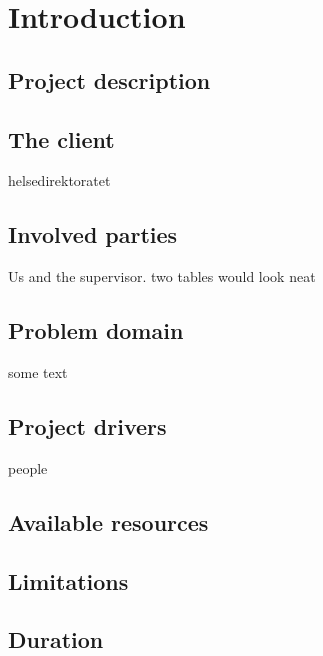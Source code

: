 
\chapter{Introduction} %

\label{Introduction} %



\section{Project description}


\section{The client}
helsedirektoratet

\section{Involved parties}

Us and the supervisor.
two tables would look neat



\section{Problem domain}
some text

\section{Project drivers}
people 

\section{Available resources}
\section{Limitations}
\section{Duration}